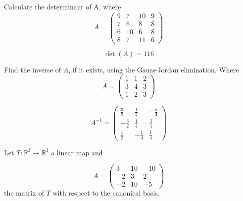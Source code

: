 \begin{questions}

\question Calculate the determinant of A, where
$$
A=\left(\begin{array}{rrrr}
9 & 7 & 10 & 9 \\
7 & 6 & 8 & 8 \\
6 & 10 & 6 & 8 \\
8 & 7 & 11 & 6
\end{array}\right)
$$

\begin{solution}
$$\det(A)=116$$
\end{solution}

\question Find the inverse of $A$, if it exists, using the Gauss-Jordan elimination. Where
$$
A=\left(\begin{array}{rrr}
1 & 1 & 2 \\
3 & 4 & 3 \\
1 & 2 & 3
\end{array}\right)
$$

\begin{solution}
$$A^{-1}=\left(\begin{array}{rrr}
\frac{3}{2} & \frac{1}{4} & -\frac{5}{4} \\
-\frac{3}{2} & \frac{1}{4} & \frac{3}{4} \\
\frac{1}{2} & -\frac{1}{4} & \frac{1}{4}
\end{array}\right)$$
\end{solution}

\question Let $T:\mathbb{R}^3\rightarrow\mathbb{R}^3$  a linear map and
 
$$
A=\left(\begin{array}{rrr}
3 & 10 & -10 \\
-2 & 3 & 2 \\
-2 & 10 & -5
\end{array}\right)
$$
the matrix of $T$ with respect to the canonical basis.
\end{questions}

